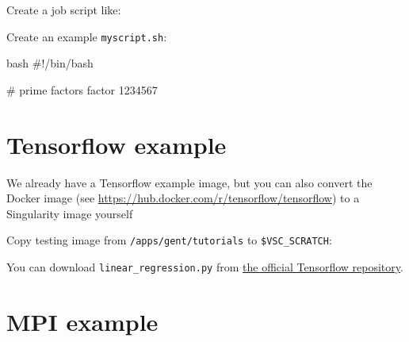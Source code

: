 \begin{prompt}
\end{prompt}

Create a job script like:


Create an example \lstinline|myscript.sh|:

\begin{code}{bash}
#!/bin/bash

# prime factors
factor 1234567
\end{code}

\section{Tensorflow example}

We already have a Tensorflow example image, but you can also convert the Docker
image (see \url{https://hub.docker.com/r/tensorflow/tensorflow}) to a Singularity image yourself

Copy testing image from \lstinline|/apps/gent/tutorials| to \lstinline|$VSC_SCRATCH|:

\begin{prompt}
\end{prompt}


You can download \lstinline|linear_regression.py| from
\href{https://github.com/tensorflow/tensorflow/blob/r1.12/tensorflow/examples/get_started/regression/linear_regression.py}{the official Tensorflow repository}.

\section{MPI example}

